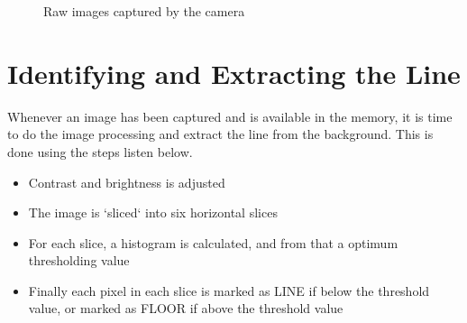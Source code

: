 \begin{figure}[!ht]
	\centering
	\caption{Raw images captured by the camera}
	\label{fig:camera_1}
\end{figure}



%
%
%
%
\section{Identifying and Extracting the Line}

Whenever an image has been captured and is available in the memory, it is time to do the image processing and extract the line from the background. This is done using the steps listen below.

\begin{itemize}
	\item Contrast and brightness is adjusted
	\item The image is `sliced` into six horizontal slices
	\item For each slice, a histogram is calculated, and from that a optimum thresholding value
	\item Finally each pixel in each slice is marked as LINE if below the threshold value, or marked as FLOOR if above the threshold value
\end{itemize}


